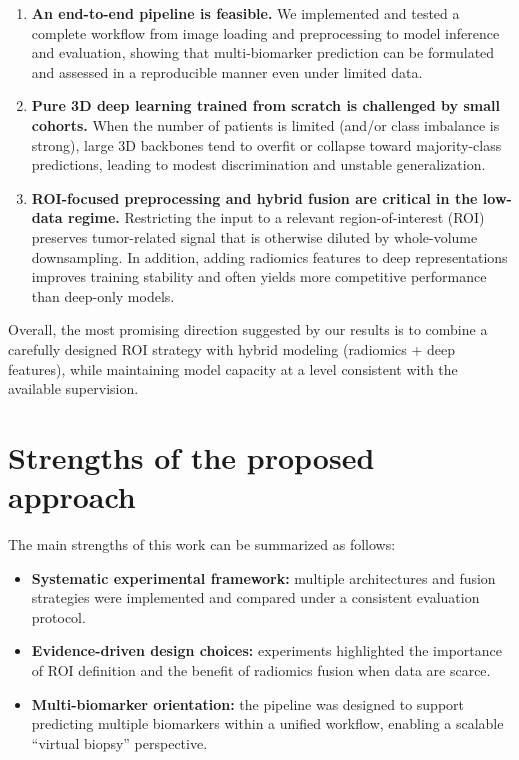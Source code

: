 \documentclass[twoside,runningheads,a4paper,11pt]{report}
\begin{document}
\begin{enumerate}
    \item \textbf{An end-to-end pipeline is feasible.} We implemented and tested a complete workflow from image loading and preprocessing to model inference and evaluation, showing that multi-biomarker prediction can be formulated and assessed in a reproducible manner even under limited data.

    \item \textbf{Pure 3D deep learning trained from scratch is challenged by small cohorts.} When the number of patients is limited (and/or class imbalance is strong), large 3D backbones tend to overfit or collapse toward majority-class predictions, leading to modest discrimination and unstable generalization.

    \item \textbf{ROI-focused preprocessing and hybrid fusion are critical in the low-data regime.} Restricting the input to a relevant region-of-interest (ROI) preserves tumor-related signal that is otherwise diluted by whole-volume downsampling. In addition, adding radiomics features to deep representations improves training stability and often yields more competitive performance than deep-only models.
\end{enumerate}

Overall, the most promising direction suggested by our results is to combine a carefully designed ROI strategy with hybrid modeling (radiomics + deep features), while maintaining model capacity at a level consistent with the available supervision.

\section{Strengths of the proposed approach}
The main strengths of this work can be summarized as follows:

\begin{itemize}
    \item \textbf{Systematic experimental framework:} multiple architectures and fusion strategies were implemented and compared under a consistent evaluation protocol.
    \item \textbf{Evidence-driven design choices:} experiments highlighted the importance of ROI definition and the benefit of radiomics fusion when data are scarce.
    \item \textbf{Multi-biomarker orientation:} the pipeline was designed to support predicting multiple biomarkers within a unified workflow, enabling a scalable ``virtual biopsy'' perspective.
\end{itemize}
\end{document}
